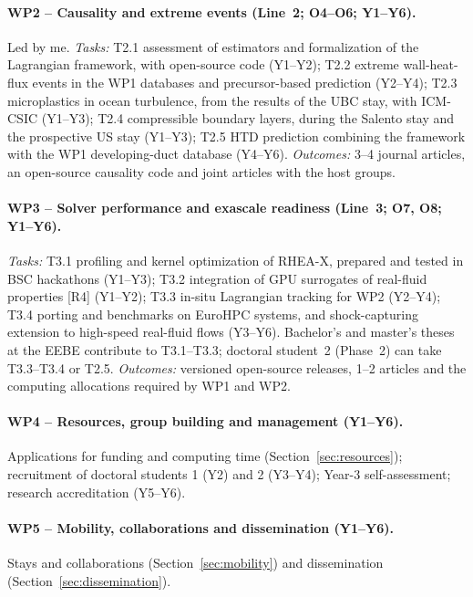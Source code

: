 \documentclass[11pt]{article}
\begin{document}
\paragraph{WP2 -- Causality and extreme events (Line~2; O4--O6; Y1--Y6).} Led by me.
\emph{Tasks:} T2.1 assessment of estimators and formalization of the Lagrangian framework,
with open-source code (Y1--Y2); T2.2 extreme wall-heat-flux events in the WP1 databases and
precursor-based prediction (Y2--Y4); T2.3 microplastics in ocean turbulence, from the results
of the UBC stay, with ICM-CSIC (Y1--Y3); T2.4 compressible boundary layers, during the
Salento stay and the prospective US stay (Y1--Y3); T2.5 HTD prediction combining the
framework with the WP1 developing-duct database (Y4--Y6).
\emph{Outcomes:} 3--4 journal articles, an open-source causality code and joint articles with
the host groups.

\paragraph{WP3 -- Solver performance and exascale readiness (Line~3; O7, O8; Y1--Y6).}
\emph{Tasks:} T3.1 profiling and kernel optimization of RHEA-X, prepared and tested in BSC
hackathons (Y1--Y3); T3.2 integration of GPU surrogates of real-fluid properties [R4] (Y1--Y2);
T3.3 in-situ Lagrangian tracking for WP2 (Y2--Y4); T3.4 porting and benchmarks on EuroHPC
systems, and shock-capturing extension to high-speed real-fluid flows (Y3--Y6). Bachelor's and master's theses at the EEBE contribute to T3.1--T3.3;
doctoral student~2 (Phase~2) can take T3.3--T3.4 or T2.5.
\emph{Outcomes:} versioned open-source releases, 1--2 articles and the computing allocations
required by WP1 and WP2.

\paragraph{WP4 -- Resources, group building and management (Y1--Y6).} Applications for
funding and computing time (Section~\ref{sec:resources}); recruitment of doctoral students
1 (Y2) and 2 (Y3--Y4); Year-3 self-assessment; research accreditation (Y5--Y6).

\paragraph{WP5 -- Mobility, collaborations and dissemination (Y1--Y6).} Stays and
collaborations (Section~\ref{sec:mobility}) and dissemination
(Section~\ref{sec:dissemination}).
\end{document}
